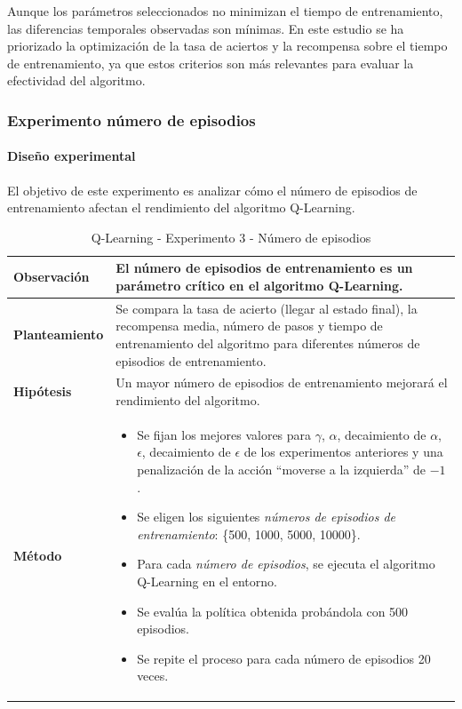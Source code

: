 Aunque los parámetros seleccionados no minimizan el tiempo de entrenamiento, las diferencias temporales observadas son mínimas. En este estudio se ha priorizado la optimización de la tasa de aciertos y la recompensa sobre el tiempo de entrenamiento, ya que estos criterios son más relevantes para evaluar la efectividad del algoritmo.

\subsubsection{Experimento número de episodios}

\paragraph{Diseño experimental}
El objetivo de este experimento es analizar cómo el número de episodios de entrenamiento afectan el rendimiento del algoritmo Q-Learning.
\begin{table}[H]
    \centering
    \begin{tabularx}{\textwidth}{|p{4cm}|X|} %
        \hline %
        \textbf{Observación} & El número de episodios de entrenamiento es un parámetro crítico en el algoritmo Q-Learning.
        \\ \hline
        \textbf{Planteamiento} & Se compara la tasa de acierto (llegar al estado final), la recompensa media, número de pasos y tiempo de entrenamiento del algoritmo para diferentes números de episodios de entrenamiento.
        \\ \hline
        \textbf{Hipótesis} & Un mayor número de episodios de entrenamiento mejorará el rendimiento del algoritmo.
        \\ \hline
        \textbf{Método} &
        \begin{itemize}
            \item Se fijan los mejores valores para \(\gamma\), \(\alpha\), decaimiento de \(\alpha\), \(\epsilon\), decaimiento de \(\epsilon\) de los experimentos anteriores y una penalización de la acción ``moverse a la izquierda'' de $-1$.
            \item Se eligen los siguientes \textit{números de episodios de entrenamiento}: \{500, 1000, 5000, 10000\}.
            \item Para cada \textit{número de episodios}, se ejecuta el algoritmo Q-Learning en el entorno.
            \item Se evalúa la política obtenida probándola con 500 episodios.
            \item Se repite el proceso para cada número de episodios 20 veces.
        \end{itemize}
        \\ \hline
    \end{tabularx}
    \caption{Q-Learning - Experimento 3 - Número de episodios}
    \label{tab:diseñoQLEarningExp3}
\end{table}


